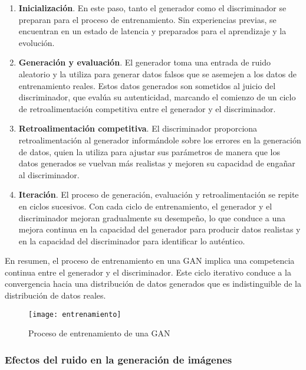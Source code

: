 \begin{enumerate}
    \item \textbf{Inicialización}. En este paso, tanto el generador como el discriminador se preparan para el proceso de entrenamiento. Sin experiencias previas, se encuentran en un estado de latencia y preparados para el aprendizaje y la evolución.
    \item \textbf{Generación y evaluación}. El generador toma una entrada de ruido aleatorio y la utiliza para generar datos falsos que se asemejen a los datos de entrenamiento reales. Estos datos generados son sometidos al juicio del discriminador, que evalúa su autenticidad, marcando el comienzo de un ciclo de retroalimentación competitiva entre el generador y el discriminador.
    \item \textbf{Retroalimentación competitiva}. El discriminador proporciona retroalimentación al generador informándole sobre los errores en la generación de datos, quien la utiliza para ajustar sus parámetros de manera que los datos generados se vuelvan más realistas y mejoren su capacidad de engañar al discriminador.
    \item \textbf{Iteración}. El proceso de generación, evaluación y retroalimentación se repite en ciclos sucesivos. Con cada ciclo de entrenamiento, el generador y el discriminador mejoran gradualmente su desempeño, lo que conduce a una mejora continua en la capacidad del generador para producir datos realistas y en la capacidad del discriminador para identificar lo auténtico.
\end{enumerate}

En resumen, el proceso de entrenamiento en una GAN implica una competencia continua entre el generador y el discriminador. Este ciclo iterativo conduce a la convergencia hacia una distribución de datos generados que es indistinguible de la distribución de datos reales.

\begin{figure}[H]
    \centering
    \texttt{[image: entrenamiento]}
    \caption{Proceso de entrenamiento de una GAN}
    \label{fig:entrenamiento-gan}
\end{figure}

\subsubsection{Efectos del ruido en la generación de imágenes}

